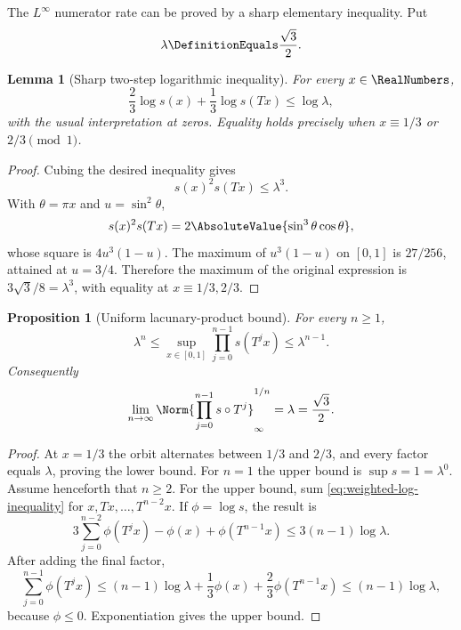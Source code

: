 \documentclass[11pt,oneside]{article}
\numberwithin{equation}{section}
\newtheorem{proposition}[theorem]{Proposition}
\newtheorem{lemma}[theorem]{Lemma}
\theoremstyle{definition}
\theoremstyle{remark}
\begin{document}
The $L^\infty$ numerator rate can be proved by a sharp elementary inequality.  Put
\begin{equation}
 \lambda\DefinitionEquals\frac{\sqrt3}{2}.
 \label{eq:lambda}
\end{equation}

\begin{lemma}[Sharp two-step logarithmic inequality]
\label{lem:sharp-sine-inequality}
For every $x\in\RealNumbers$,
\begin{equation}
 \frac23\log s(x)+\frac13\log s(Tx)\le\log\lambda,
 \label{eq:weighted-log-inequality}
\end{equation}
with the usual interpretation at zeros.  Equality holds precisely when
$x\equiv1/3$ or $2/3\pmod1$.
\end{lemma}

\begin{proof}
Cubing the desired inequality gives
\[
 s(x)^2s(Tx)\le\lambda^3.
\]
With $\theta=\pi x$ and $u=\sin^2\theta$,
\[
 s(x)^2s(Tx)=2\AbsoluteValue{\sin^3\theta\cos\theta},
\]
whose square is $4u^3(1-u)$.  The maximum of $u^3(1-u)$ on $[0,1]$ is $27/256$, attained
at $u=3/4$.  Therefore the maximum of the original expression is
$3\sqrt3/8=\lambda^3$, with equality at $x\equiv1/3,2/3$.
\end{proof}

\begin{proposition}[Uniform lacunary-product bound]
\label{prop:Bn-uniform}
For every $n\ge1$,
\begin{equation}
 \lambda^n\le\sup_{x\in[0,1]}
 \prod_{j=0}^{n-1}s(T^jx)\le\lambda^{n-1}.
 \label{eq:Bn-uniform}
\end{equation}
Consequently
\begin{equation}
 \lim_{n\to\infty}\Norm{\prod_{j=0}^{n-1}s\circ T^j}_{\infty}^{1/n}
 =\lambda=\frac{\sqrt3}{2}.
 \label{eq:Gelfond-rate}
\end{equation}
\end{proposition}

\begin{proof}
At $x=1/3$ the orbit alternates between $1/3$ and $2/3$, and every factor equals
$\lambda$, proving the lower bound.  For $n=1$ the upper bound is
$\sup s=1=\lambda^0$.  Assume henceforth that $n\ge2$.  For the upper bound, sum
\eqref{eq:weighted-log-inequality} for $x,Tx,\dots,T^{n-2}x$.  If
$\phi=\log s$, the result is
\[
 3\sum_{j=0}^{n-2}\phi(T^jx)-\phi(x)+\phi(T^{n-1}x)
 \le3(n-1)\log\lambda.
\]
After adding the final factor,
\[
 \sum_{j=0}^{n-1}\phi(T^jx)
 \le(n-1)\log\lambda+\frac13\phi(x)+\frac23\phi(T^{n-1}x)
 \le(n-1)\log\lambda,
\]
because $\phi\le0$.  Exponentiation gives the upper bound.
\end{proof}
\end{document}
